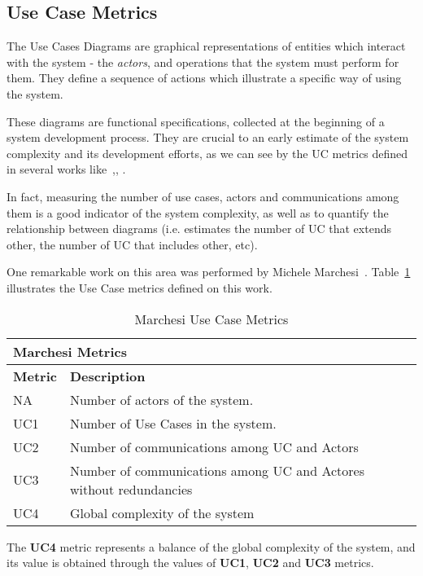 \subsection{Use Case Metrics}

The Use Cases Diagrams are graphical representations of entities which interact with the system - the \emph{actors}, and operations that the system must perform for them.
They define a sequence of actions which illustrate a specific way of using the system.

These diagrams are functional specifications, collected at the beginning of a system development process.
They are crucial to an early estimate of the system complexity and its development efforts, as we can see by the UC metrics defined in several works like~\cite{Kim02developingsoftware},\cite{Mohagheghi05effortestimation}, \cite{Ribu01estimatingobject-oriented}.

In fact, measuring the number of use cases, actors and communications among them is a good indicator of the system complexity, as well as to quantify the relationship between diagrams (i.e. estimates the number of UC that extends other, the number of UC that includes other, etc).

One remarkable work on this area was performed by Michele Marchesi~\cite{Marchesi:1998:OMU:522081.795010}.
Table~\ref{t:ucm} illustrates the Use Case metrics defined on this work. 
 
\begin{table}[h]\centering
\begin{tabular}{ p{} | p{10.5cm}}
\multicolumn{2}{l}{\textbf{Marchesi Metrics}} \\ \hline
\textbf{Metric} & \textbf{Description} \\ \hline
NA & Number of actors of the system. \\ \hline
UC1 & Number of Use Cases in the system. \\ \hline 
UC2 & Number of communications among UC and Actors  \\ \hline 
UC3 & Number of communications among UC and Actores without redundancies \\ \hline 
UC4 & Global complexity of the system \\ \hline 
\end{tabular}
\caption{\small{Marchesi Use Case Metrics}}
\label{t:ucm}
\end{table}

The \textbf{UC4} metric represents a balance of the global complexity of the system, and its value is obtained through the values of \textbf{UC1}, \textbf{UC2} and \textbf{UC3} metrics.
